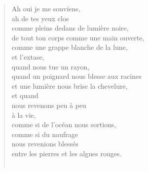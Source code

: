 \documentclass[11pt,a4paper]{book}
\begin{document}
\begin{verse}
Ah oui je me souviens, \\
ah de tes yeux clos \\
comme pleins dedans de lumière noire, \\
de tout ton corps comme une main ouverte, \\
comme une grappe blanche de la lune, \\
et l'extase, \\
quand nous tue un rayon, \\
quand un poignard nous blesse aux racines \\
et une lumière nous brise la chevelure, \\
et quand \\
nous revenons peu à peu \\
à la vie, \\
comme si de l'océan nous sortions, \\
comme si du naufrage \\
nous revenions blessés \\
entre les pierres et les algues rouges. \\ \


\end{verse}
\end{document}
